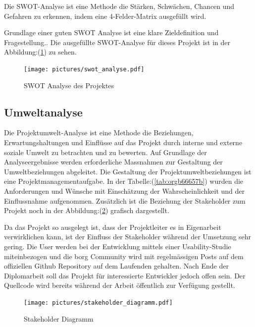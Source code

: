 Die SWOT-Analyse ist eine Methode die Stärken, Schwächen, Chancen und
Gefahren zu erkennen, indem eine 4-Felder-Matrix ausgefüllt wird.

Grundlage einer guten SWOT Analyse ist eine klare Zieldefinition und
Fragestellung.. Die ausgefüllte SWOT-Analyse für dieses Projekt ist in der
Abbildung:(\ref{fig:org1eae858}) zu sehen.

\begin{figure}[htbp]
\centering
\texttt{[image: pictures/swot\_analyse.pdf]}
\caption{\label{fig:org1eae858}
SWOT Analyse des Projektes}
\end{figure}

\subsection{Umweltanalyse}
\label{sec:org9d9bddc}

Die Projektumwelt-Analyse ist eine Methode die Beziehungen,
Erwartungshaltungen und Einflüsse auf das Projekt durch interne und
externe soziale Umwelt zu betrachten und zu bewerten. Auf Grundlage
der Analyseergebnisse werden erforderliche Massnahmen zur Gestaltung
der Umweltbeziehungen abgeleitet. Die Gestaltung der
Projektumweltbeziehungen ist eine Projektmanagementaufgabe. In der
Tabelle:(\ref{tab:orgb66657b}) wurden die Anforderungen und Wünsche
mit Einschätzung der Wahrscheinlichkeit und der Einflussnahme aufgenommen.
Zusätzlich ist die Beziehung der Stakeholder zum Projekt noch in der
Abbildung:(\ref{fig:org96e2a60}) grafisch dargestellt.

Da das Projekt so ausgelegt ist, dass der Projektleiter es in Eigenarbeit
verwirklichen kann, ist der Einfluss der Stakeholder während der Umsetzung sehr
gering. Die User werden bei der Entwicklung mittels einer
Usability-Studie miteinbezogen und die \gls{borg} Community wird mit
regelmässigen Posts auf dem offiziellen Github Repository auf dem Laufenden
gehalten. Nach Ende der Diplomarbeit soll das Projekt für interessierte
Entwickler jedoch offen sein. Der Quellcode wird bereits während der Arbeit
öffentlich zur Verfügung gestellt.

\begin{figure}[htbp]
\centering
\texttt{[image: pictures/stakeholder\_diagramm.pdf]}
\caption{\label{fig:org96e2a60}
Stakeholder Diagramm}
\end{figure}

